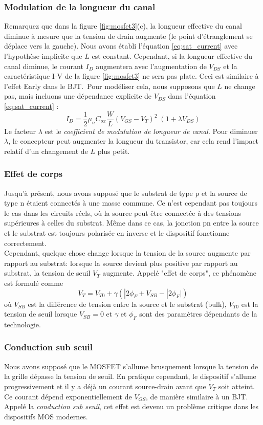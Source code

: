 \subsubsection{Modulation de la longueur du canal}
Remarquez que dans la figure \ref{fig:mosfet3}(c), la longueur effective du canal diminue à mesure que la tension de drain augmente (le point d'étranglement se déplace vers la gauche). Nous avons établi l'équation \ref{eq:sat_current} avec l'hypothèse implicite que $L$ est constant. Cependant, si la longueur effective du canal diminue, le courant $I_D$ augmentera avec l'augmentation de $V_{DS}$ et la caractéristique I-V de la figure \ref{fig:mosfet3} ne sera pas plate. Ceci est similaire à l'effet Early dans le BJT.\
Pour modéliser cela, nous supposons que $L$ ne change pas, mais incluons une dépendance explicite de $V_{DS}$ dans l'équation \ref{eq:sat_current} :
\begin{equation}
    I_{D} = \frac{1}{2} \mu_n C_{ox} \frac{W}{L} (V_{GS} - V_T)^2 \; (1 + \lambda V_{DS})
    \label{eq:sat_current2}
\end{equation}
Le facteur $\lambda$ est le \emph{coefficient de modulation de longueur de canal}. Pour diminuer $\lambda$, le concepteur peut augmenter la longueur du transistor, car cela rend l'impact relatif d'un changement de $L$ plus petit.
\subsubsection{Effet de corps}
Jusqu'à présent, nous avons supposé que le substrat de type p et la source de type n étaient connectés à une masse commune. Ce n'est cependant pas toujours le cas dans les circuits réels, où la source peut être connectée à des tensions supérieures à celles du substrat. Même dans ce cas, la jonction pn entre la source et le substrat est toujours polarisée en inverse et le dispositif fonctionne correctement.\\
Cependant, quelque chose change lorsque la tension de la source augmente par rapport au substrat: lorsque la source devient plus positive par rapport au substrat, la tension de seuil $V_T$ augmente. Appelé "effet de corps", ce phénomène est formulé comme
$$V_T = V_{T0} + \gamma (|2\phi_F + V_{SB} - |2\phi_F|)$$
où $V_{SB}$ est la différence de tension entre la source et le substrat (bulk), $V_{T0}$ est la tension de seuil lorsque $V_{SB} = 0$ et $\gamma$ et $\phi_F$ sont des paramètres dépendants de la technologie.
\subsubsection{Conduction sub seuil}
\label{sec:subthreshold_conduction}
Nous avons supposé que le MOSFET s'allume brusquement lorsque la tension de la grille dépasse la tension de seuil. En pratique cependant, le dispositif s'allume progressivement et il y a déjà un courant source-drain avant que $V_T$ soit atteint. Ce courant dépend exponentiellement de $V_{GS}$, de manière similaire à un BJT. Appelé la \emph{conduction sub seuil}, cet effet est devenu un problème critique dans les dispositifs MOS modernes.